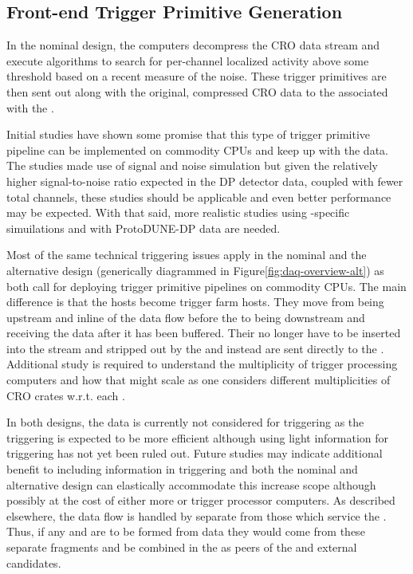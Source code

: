 \subsection{Front-end Trigger Primitive Generation}
\label{sec:fd-daq-fetp}

In the nominal design, the  computers decompress the
CRO data stream and execute algorithms to search for per-channel
localized activity above some threshold based on a recent measure of
the noise. 
These trigger primitives are then sent out along with the original,
compressed CRO data to the  associated with the .

Initial studies have shown some promise that this type of trigger
primitive pipeline can be implemented on commodity CPUs and keep up
with the data. 
The studies made use of  signal and noise simulation but
given the relatively higher signal-to-noise ratio expected in the DP
detector data, coupled with fewer total channels, these studies should
be applicable and even better performance may be expected. 
With that said, more realistic studies using -specific
simuilations and with ProtoDUNE-DP data are needed.

Most of the same technical triggering issues apply in the nominal and
the alternative design (generically diagrammed in
Figure\ref{fig:daq-overview-alt}) as both call for deploying trigger
primitive pipelines on commodity CPUs. 
The main difference is that the  hosts become trigger farm
hosts. 
They move from being upstream and inline of the data flow before the
 to being downstream and receiving the data after it has
been buffered. 
Their  no longer have to be inserted into the
stream and stripped out by the  and instead are sent
directly to the . 
Additional study is required to understand the multiplicity of trigger
processing computers and how that might scale as one considers
different multiplicities of CRO  crates w.r.t. each
.

In both designs, the  data is currently not considered for
triggering as the  triggering is expected to be more
efficient although using light information for triggering has not yet
been ruled out. 
Future studies may indicate additional benefit to including
 information in triggering and both the nominal and
alternative design can elastically accommodate this increase scope
although possibly at the cost of either more  or trigger
processor computers.
As described elsewhere, the  data flow is handled by
separate  from those which service the . 
Thus, if any  and  are to
be formed from  data they would come from these separate
fragments and be combined in the  as peers of the
 and external candidates.

